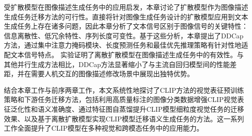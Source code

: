 受扩散模型在图像描述生成任务中的应用启发，本章讨论了扩散模型作为图像描述生成任务迁移方法的可行性。直接将针对图像生成任务设计的扩散模型应用到文本生成任务上存在诸多问题，因此本章分析了文本信号区别于图像信号的关键特性：信息离散性、低冗余特性、序列长度可变性。基于这些分析，本章提出了DDCap方法，通过集中注意力掩码模块、长度预测任务和最佳优先推理策略有针对性地适配文本信号特点。
实验证明了离散扩散模型在图像描述生成任务中的有效性。与其他并行生成方法相比，DDCap方法显著缩小了与主流自回归模型间的性能差距，并在需要人机交互的图像描述修改场景中展现出独特优势。


结合本章工作与前序两章工作，本文系统性地探讨了CLIP方法的视觉表征预训练策略和下游任务迁移方法，包括利用高质量标注的图像分类数据增强CLIP视觉表征泛化性和语义准确度、通过特征图自蒸馏提升CLIP模型细粒度视觉任务的迁移效果、以及基于离散扩散模型实现CLIP模型迁移语义生成任务的方法。这一系列工作全面提升了CLIP模型在多种视觉和跨模态任务中的应用能力。

